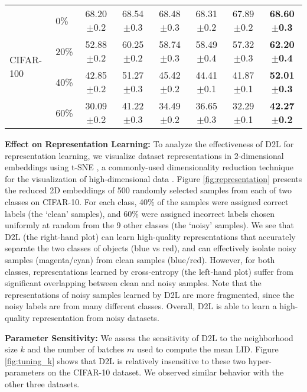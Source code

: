 \documentclass{article}
\begin{document}
\begin{table*}[!tb]
\begin{tabular}{ll|cccccc}
\hline
\multirow{4}{*}{CIFAR-100}
& 0\% & 68.20$\pm$0.2 & 68.54$\pm$0.3 & 68.48$\pm$0.3 & 68.31$\pm$0.2 & 67.89$\pm$0.2 & \textbf{68.60$\pm$0.3}  \\
& 20\% & 52.88$\pm$0.2  & 60.25$\pm$0.2 & 58.74$\pm$0.3 & 58.49$\pm$0.4 & 57.32$\pm$0.3 & \textbf{62.20$\pm$0.4}  \\
& 40\% & 42.85$\pm$0.2  & 51.27$\pm$0.3 & 45.42$\pm$0.2 & 44.41$\pm$0.1 & 41.87$\pm$0.1 & \textbf{52.01$\pm$0.3}  \\
& 60\% & 30.09$\pm$0.2  & 41.22$\pm$0.3 & 34.49$\pm$0.2 & 36.65$\pm$0.3 & 32.29$\pm$0.1 & \textbf{42.27$\pm$0.2}  \\
\hline
\end{tabular}
\end{table*}



\textbf{Effect on Representation Learning:}
\label{sec:regularization}
To analyze the effectiveness of D2L for representation learning, we visualize dataset representations in 2-dimensional embeddings using t-SNE \cite{maaten2008visualizing}, a commonly-used dimensionality reduction technique for the visualization of high-dimensional data \cite{lecun2015deep}. Figure \ref{fig:representation} presents the reduced 2D embeddings of 500 randomly selected samples from each of two classes on CIFAR-10. For each class, 40\% of the samples were assigned correct labels (the `clean' samples), and 60\% were assigned incorrect labels chosen uniformly at random from the 9 other classes (the `noisy' samples). We see that D2L (the right-hand plot) can learn high-quality representations that accurately separate the two classes of objects (blue vs red), and can effectively isolate noisy samples (magenta/cyan) from clean samples (blue/red). However, for both classes, representations learned by cross-entropy (the left-hand plot) suffer from significant overlapping between clean and noisy samples. Note that the representations of noisy samples learned by D2L are more fragmented, since the noisy labels are from many different classes. Overall, D2L is able to learn a high-quality representation from noisy datasets.











\textbf{Parameter Sensitivity:} We assess the sensitivity of D2L to the neighborhood size $k$ and the number of batches $m$ used to compute the mean LID. Figure \ref{fig:tuning_k} shows that D2L is relatively insensitive to these two hyper-parameters on the CIFAR-10 dataset. We observed similar behavior with the other three datasets.
\end{document}
